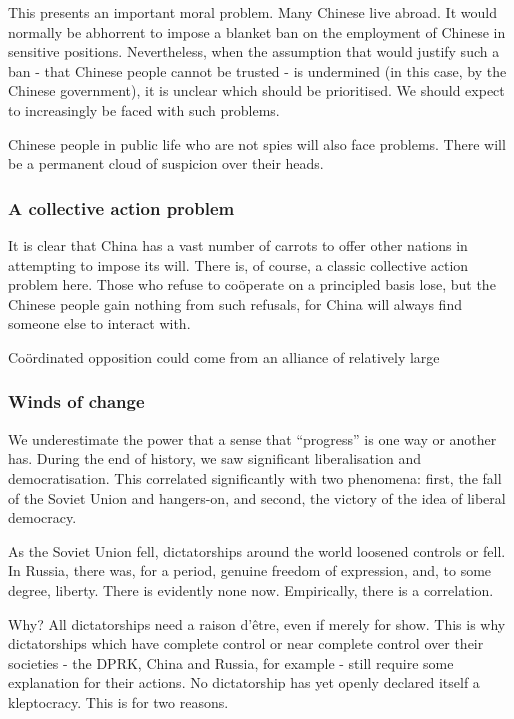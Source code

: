 This presents an important moral problem. Many Chinese live abroad. It
would normally be abhorrent to impose a blanket ban on the employment of
Chinese in sensitive positions. Nevertheless, when the assumption that
would justify such a ban - that Chinese people cannot be trusted - is
undermined (in this case, by the Chinese government), it is unclear
which should be prioritised. We should expect to increasingly be faced
with such problems.

Chinese people in public life who are not spies will also face problems.
There will be a permanent cloud of suspicion over their heads.

\subsubsection{A collective action
problem}\label{a-collective-action-problem}

It is clear that China has a vast number of carrots to offer other
nations in attempting to impose its will. There is, of course, a classic
collective action problem here. Those who refuse to coöperate on a
principled basis lose, but the Chinese people gain nothing from such
refusals, for China will always find someone else to interact with.

Coördinated opposition could come from an alliance of relatively large

\subsubsection{Winds of change}\label{winds-of-change}

We underestimate the power that a sense that ``progress'' is one way or
another has. During the end of history, we saw significant
liberalisation and democratisation. This correlated significantly with
two phenomena: first, the fall of the Soviet Union and hangers-on, and
second, the victory of the idea of liberal democracy.

As the Soviet Union fell, dictatorships around the world loosened
controls or fell. In Russia, there was, for a period, genuine freedom of
expression, and, to some degree, liberty. There is evidently none now.
Empirically, there is a correlation.

Why? All dictatorships need a raison d'être, even if merely for show.
This is why dictatorships which have complete control or near complete
control over their societies - the DPRK, China and Russia, for example -
still require some explanation for their actions. No dictatorship has
yet openly declared itself a kleptocracy. This is for two reasons.

